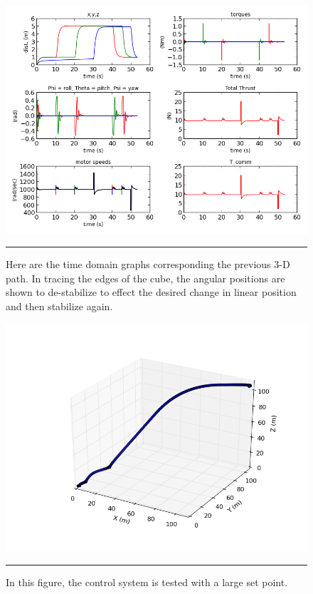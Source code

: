 \begin{figure}[htbp]
	\centering
		\includegraphics[scale = 0.5]{Figures/CubeEdgesGraphs.png}
		\rule{35em}{0.5pt}
	\caption[Cube Edges Time Domain]{Here are the time domain graphs corresponding the previous 3-D path. In tracing the edges of the cube, the angular positions are shown to de-stabilize to effect the desired change in linear position and then stabilize again.}
	\label{fig:Cube Edges Time Domain}
\end{figure}


\begin{figure}[htbp]
	\centering
		\includegraphics[scale = 0.5]{Figures/largeSetpointDifferencesTest_3d.png}
		\rule{35em}{0.5pt}
	\caption[Large Set Points 3D Path]{In this figure, the control system is tested with a large set point. }
	\label{fig:Large Setpoints 3D Path}
\end{figure}

